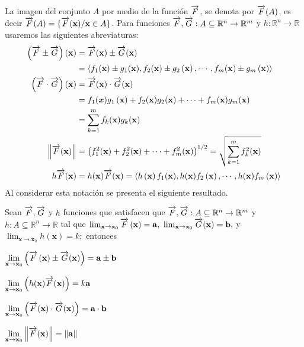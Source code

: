 La imagen del conjunto $A$ por medio de la función $\overrightarrow{F}$, se denota por $\overrightarrow{F}(A)$, es decir
$\overrightarrow{F}(A)=\{\overrightarrow{F}(\mathbf{x})/\mathbf{x}\in A\}$.
Para funciones $\overrightarrow{F},\overrightarrow{G}:A\subseteq \mathbb{R}^n\to \mathbb{R}^m$
y $h:\mathbb{R}^n \to \mathbb{R}$ usaremos las siguientes abreviaturas:
\begin{align*}
  \left( \ve{F}\pm \ve{G}\right) \left( \mathbf{x} \right) &= \ve{F}(\mathbf{x}) \pm \ve{G}(\mathbf{x})\\
  &= \left\langle f_{1}(\mathbf{x}) \pm g_{1}(\mathbf{x}) ,f_{2}(\mathbf{x}) \pm g_{2}\left(
  \mathbf{x}\right) ,\cdots ,f_{m}(\mathbf{x}) \pm g_{m}\left(  \mathbf{x}\right) \right\rangle \\
  \left( \ve{F}\cdot \ve{G}\right) \left( \mathbf{x} \right) &= \ve{F}(\mathbf{x}) \cdot \ve{G}%
  (\mathbf{x}) \\
  &= f_{1}(\bm{x}) g_{1}\left( \mathbf{x}\right) +f_{2}(\mathbf{x}) g_{2}(\mathbf{x})
  +\cdots +f_{m}(\mathbf{x}) g_{m}(\mathbf{x}) \\
  &= \sum_{k=1}^{m}f_{k}(\mathbf{x}) g_{k}(\mathbf{x}) \\
  \left\Vert \ve{F}(\mathbf{x}) \right\Vert &= \left( f_{1}^{2}(\mathbf{x}) +f_{2}^{2}(\mathbf{x}) +\cdots
  +f_{m}^{2}(\mathbf{x}) \right) ^{1/2}=\sqrt{\sum_{k=1}^{m}f_{k}^{2}(\mathbf{x}) }\\
  h\ve{F}(\mathbf{x}) &= h(\mathbf{x}) \ve{F}(\mathbf{x}) =\left\langle h\left( \mathbf{x} \right) f_{1}(\mathbf{x}) ,h(\mathbf{x}) f_{2}\left( \mathbf{x}\right) ,\cdots ,h(\mathbf{x}) f_{m}\left( \mathbf{x}\right) \right\rangle
\end{align*}
Al considerar esta notación se presenta el siguiente resultado.

\begin{teorema}\label{teo1}
  Sean $\overrightarrow{F},\overrightarrow{G}$ y $h$ funciones que satisfacen que
  $\overrightarrow{F},\overrightarrow{G}:A\subseteq \mathbb{R}^n\to \mathbb{R}^m$ y $h:A\subseteq \mathbb{R}^n\to \mathbb{R}$ tal que
  $\lim_{\mathbf{x\to x}_{0}}\ve{F}\left( \mathbf{x}%
  \right) =\mathbf{a,}$ $\lim_{\mathbf{x\to x}_{0}}\ve{G}%
  (\mathbf{x}) =\mathbf{b,}$ y $\lim_{\mathbf{x\to x}%
  _{0}}h(\mathbf{x}) =k;$ entonces

  \begin{parrafonumerado}

  \item $\ds \lim_{\mathbf{x\to x}_{0}}\left( \ve{F}\left( \mathbf{x}%
    \right) \pm \ve{G}(\mathbf{x}) \right) =\mathbf{a\pm b}$

  \item $\displaystyle\lim_{\mathbf{x\to x}_{0}}\left( h(\mathbf{x})
    \overrightarrow{F}(\mathbf{x}) \right) =k\mathbf{a}$

  \item $\displaystyle\lim_{\mathbf{x\to x}_{0}}\left( \overrightarrow{F}(\mathbf{x}) \cdot \overrightarrow{G}(\mathbf{x}) \right) =\mathbf{a\cdot b}$

  \item $\displaystyle\lim_{\mathbf{x\to x}_{0}}\left\Vert \overrightarrow{F}(\mathbf{x}) \right\Vert =\left\Vert \mathbf{a}\right\Vert $
  \end{parrafonumerado}
\end{teorema}


